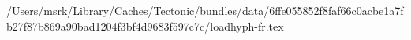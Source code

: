 /Users/msrk/Library/Caches/Tectonic/bundles/data/6ffe055852f8faf66c0acbe1a7fb27f87b869a90bad1204f3bf4d9683f597c7c/loadhyph-fr.tex